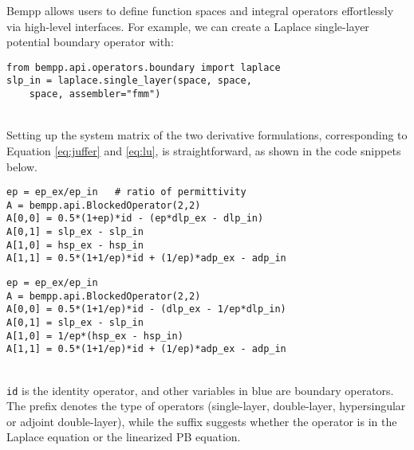 Bempp allows users to define function spaces and integral operators effortlessly via high-level interfaces.
For example, we can create a Laplace single-layer potential boundary operator with:
\begin{adjustbox}{max width=\linewidth}
    \begin{lstlisting}
from bempp.api.operators.boundary import laplace
slp_in = laplace.single_layer(space, space,
    space, assembler="fmm")
    \end{lstlisting}
\end{adjustbox} \\
Setting up the system matrix of the two derivative formulations, corresponding to Equation \ref{eq:juffer} and \ref{eq:lu}, is straightforward, as shown in the code snippets below.

\begin{adjustbox}{max width=\linewidth}
    \begin{lstlisting}[caption=Interior formulation,
        label={lst:interior_formulation},
        emph={id, slp_in, slp_ex, dlp_in, dlp_ex,
        hsp_in, hsp_ex, adp_in, adp_ex},
        emphstyle=\color{textblue}
        ]
ep = ep_ex/ep_in   # ratio of permittivity
A = bempp.api.BlockedOperator(2,2)
A[0,0] = 0.5*(1+ep)*id - (ep*dlp_ex - dlp_in)
A[0,1] = slp_ex - slp_in
A[1,0] = hsp_ex - hsp_in
A[1,1] = 0.5*(1+1/ep)*id + (1/ep)*adp_ex - adp_in
    \end{lstlisting}
\end{adjustbox}

\begin{adjustbox}{max width=\linewidth}
    \begin{lstlisting}[caption=Exterior formulation, 
        label={lst:exterior_formulation},
        emph={id, slp_in, slp_ex, dlp_in, dlp_ex,
        hsp_in, hsp_ex, adp_in, adp_ex},
        emphstyle=\color{textblue}
        ]
ep = ep_ex/ep_in
A = bempp.api.BlockedOperator(2,2)
A[0,0] = 0.5*(1+1/ep)*id - (dlp_ex - 1/ep*dlp_in)
A[0,1] = slp_ex - slp_in
A[1,0] = 1/ep*(hsp_ex - hsp_in)
A[1,1] = 0.5*(1+1/ep)*id + (1/ep)*adp_ex - adp_in
    \end{lstlisting}
\end{adjustbox} \\

\noindent
\texttt{id} is the identity operator, and other variables in blue are boundary operators.
The prefix denotes the type of operators (single-layer, double-layer, hypersingular or adjoint double-layer), while the suffix suggests whether the operator is in the Laplace equation or the linearized PB equation.

